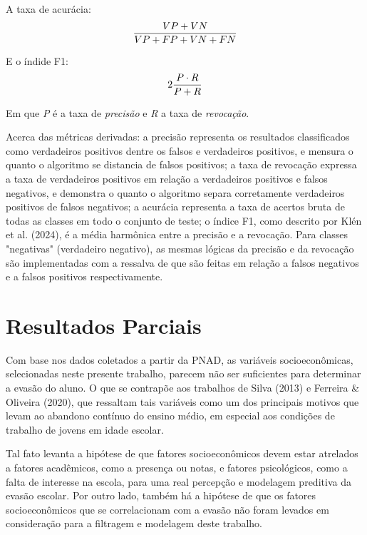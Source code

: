\documentclass[english, spanish, brazilian]{RBIEarticle} %
\begin{document}
\vspace{0.5cm}
A taxa de acurácia:
\begin{equation}
    \large \frac{VP+VN}{VP+FP+VN+FN}
\end{equation}
\vspace{0.5cm}

\vspace{0.5cm}
E o índide F1:
\begin{equation}
    \large 2 \frac{P \cdot R}{P+R}
\end{equation}
\vspace{0.5cm}

Em que \textit{P} é a taxa de \textit{precisão} e \textit{R} a taxa de \textit{revocação}.

Acerca das métricas derivadas: a precisão representa os resultados classificados como verdadeiros positivos dentre os falsos e verdadeiros positivos, e mensura o quanto o algoritmo se distancia de falsos positivos; a taxa de revocação expressa a taxa de verdadeiros positivos em relação a verdadeiros positivos e falsos negativos, e demonstra o quanto o algoritmo separa corretamente verdadeiros positivos de falsos negativos; a acurácia representa a taxa de acertos bruta de todas as classes em todo o conjunto de teste; o índice F1, como descrito por Klén et al. (2024), é a média harmônica entre a precisão e a revocação. Para classes "negativas" (verdadeiro negativo), as mesmas lógicas da precisão e da revocação são implementadas com a ressalva de que são feitas em relação a falsos negativos e a falsos positivos respectivamente. 

\section{Resultados Parciais}

Com base nos dados coletados a partir da PNAD, as variáveis socioeconômicas, selecionadas neste presente trabalho, parecem não ser suficientes para determinar a evasão do aluno. O que se contrapõe aos trabalhos de Silva (2013) e Ferreira \& Oliveira (2020), que ressaltam tais variáveis como um dos principais motivos que levam ao abandono contínuo do ensino médio, em especial aos condições de trabalho de jovens em idade escolar.

Tal fato levanta a hipótese de que fatores socioeconômicos devem estar atrelados a fatores acadêmicos, como a presença ou notas, e fatores psicológicos, como a falta de interesse na escola, para uma real percepção e modelagem preditiva da evasão escolar. Por outro lado, também há a hipótese de que os fatores socioeconômicos que se correlacionam com a evasão não foram levados em consideração para a filtragem e modelagem deste trabalho.
\end{document}
